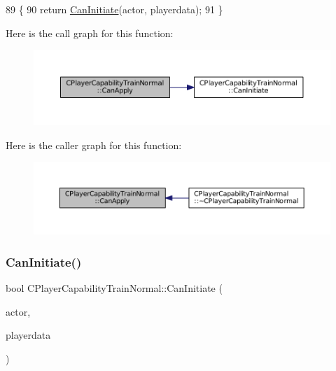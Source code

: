\begin{DoxyCode}
89                                                                                                            
                                                        \{
90     \textcolor{keywordflow}{return} \hyperlink{classCPlayerCapabilityTrainNormal_ac49cf646b94220844a03b7c3a8a7f215}{CanInitiate}(actor, playerdata);
91 \}
\end{DoxyCode}
Here is the call graph for this function\+:
\nopagebreak
\begin{figure}[H]
\begin{center}
\leavevmode
\includegraphics[width=350pt]{classCPlayerCapabilityTrainNormal_a625d2154bed47357f45662fe5dee7c1b_cgraph}
\end{center}
\end{figure}
Here is the caller graph for this function\+:
\nopagebreak
\begin{figure}[H]
\begin{center}
\leavevmode
\includegraphics[width=350pt]{classCPlayerCapabilityTrainNormal_a625d2154bed47357f45662fe5dee7c1b_icgraph}
\end{center}
\end{figure}
\hypertarget{classCPlayerCapabilityTrainNormal_ac49cf646b94220844a03b7c3a8a7f215}{}\label{classCPlayerCapabilityTrainNormal_ac49cf646b94220844a03b7c3a8a7f215} 
\subsubsection{\texorpdfstring{Can\+Initiate()}{CanInitiate()}}
{\footnotesize\ttfamily bool C\+Player\+Capability\+Train\+Normal\+::\+Can\+Initiate (\begin{DoxyParamCaption}\item[{std\+::shared\+\_\+ptr$<$ \hyperlink{classCPlayerAsset}{C\+Player\+Asset} $>$}]{actor,  }\item[{std\+::shared\+\_\+ptr$<$ \hyperlink{classCPlayerData}{C\+Player\+Data} $>$}]{playerdata }\end{DoxyParamCaption})\hspace{0.3cm}{\ttfamily [virtual]}}



